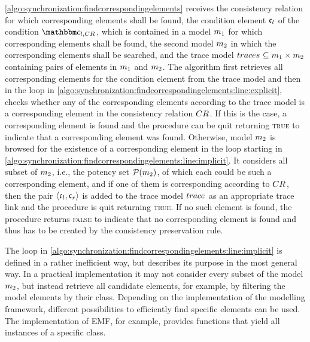 \autoref{algo:synchronization:findcorrespondingelements} receives the consistency relation for which corresponding elements shall be found, the condition element $\mathfrak{c}_{l}$ of the condition $\condition{c}{l,\consistencyrelation{CR}{}}$, which is contained in a model $m_{1}$ for which corresponding elements shall be found, the second model $m_{2}$ in which the corresponding elements shall be searched, and the trace model $traces_{} \subseteq m_{1} \times m_{2}$ containing pairs of elements in $m_{1}$ and $m_{2}$.
The algorithm first retrieves all corresponding elements for the condition element from the trace model and then in the loop in \autoref{algo:synchronization:findcorrespondingelements:line:explicit}, checks whether any of the corresponding elements according to the trace model is a corresponding element in the consistency relation $CR_{}$.
If this is the case, a corresponding element is found and the procedure can be quit returning \textsc{true} to indicate that a corresponding element was found.
Otherwise, model $m_{2}$ is browsed for the existence of a corresponding element in the loop starting in \autoref{algo:synchronization:findcorrespondingelements:line:implicit}.
It considers all subset of $m_{2}$, i.e., the potency set $\mathcal{P}(m_{2})$, of which each could be such a corresponding element, and if one of them is corresponding according to $CR_{}$, then the pair $\langle \mathfrak{c}_{l},\mathfrak{c}_{r} \rangle$ is added to the trace model $trace_{}$ as an appropriate trace link and the procedure is quit returning \textsc{true}.
If no such element is found, the procedure returns \textsc{false} to indicate that no corresponding element is found and thus has to be created by the consistency preservation rule.

The loop in \autoref{algo:synchronization:findcorrespondingelements:line:implicit} is defined in a rather inefficient way, but describes its purpose in the most general way.
In a practical implementation it may not consider every subset of the model $m_{2}$, but instead retrieve all candidate elements, for example, by filtering the model elements by their class.
Depending on the implementation of the modelling framework, different possibilities to efficiently find specific elements can be used.
The implementation of \gls{EMF}, for example, provides functions that yield all instances of a specific class.

